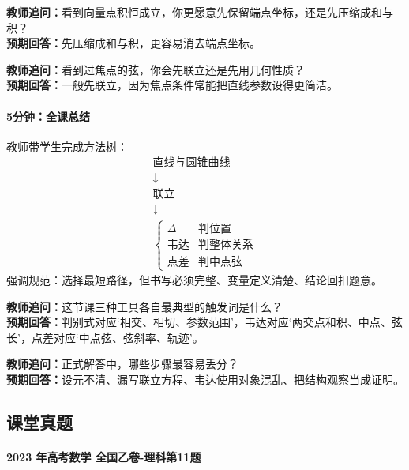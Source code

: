 \documentclass[UTF8,a4paper,11pt]{ctexart}
\begin{document}
\noindent\textbf{教师追问：}看到向量点积恒成立，你更愿意先保留端点坐标，还是先压缩成和与积？\\

\textbf{预期回答：}先压缩成和与积，更容易消去端点坐标。\par

\noindent\textbf{教师追问：}看到过焦点的弦，你会先联立还是先用几何性质？\\

\textbf{预期回答：}一般先联立，因为焦点条件常能把直线参数设得更简洁。\par

\paragraph{5分钟：全课总结}

教师带学生完成方法树：\[\begin{array}{c}
\text{直线与圆锥曲线}\\
\downarrow\\
\text{联立}\\
\downarrow\\
\begin{cases}
\Delta & \text{判位置}\\
\text{韦达} & \text{判整体关系}\\
\text{点差} & \text{判中点弦}
\end{cases}
\end{array}\] 强调规范：选择最短路径，但书写必须完整、变量定义清楚、结论回扣题意。

\noindent\textbf{教师追问：}这节课三种工具各自最典型的触发词是什么？\\

\textbf{预期回答：}判别式对应‘相交、相切、参数范围’，韦达对应‘两交点和积、中点、弦长’，点差对应‘中点弦、弦斜率、轨迹’。\par

\noindent\textbf{教师追问：}正式解答中，哪些步骤最容易丢分？\\

\textbf{预期回答：}设元不清、漏写联立方程、韦达使用对象混乱、把结构观察当成证明。\par

\subsection*{课堂真题}

\paragraph{2023 年高考数学 全国乙卷-理科第11题}
\end{document}
